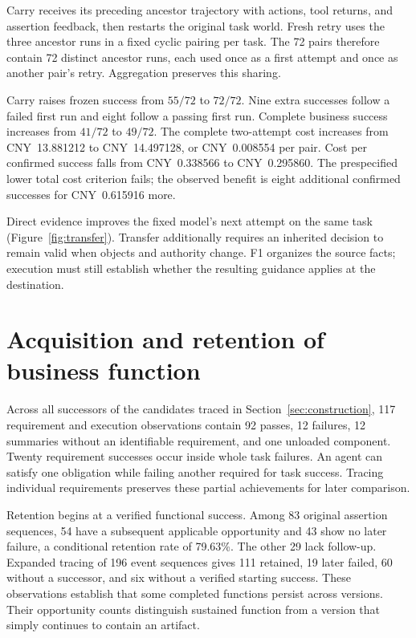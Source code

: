 \documentclass{ecai}
\begin{document}
Carry receives its preceding ancestor trajectory with actions, tool returns, and assertion feedback, then restarts the original task world. Fresh retry uses the three ancestor runs in a fixed cyclic pairing per task. The 72 pairs therefore contain 72 distinct ancestor runs, each used once as a first attempt and once as another pair's retry. Aggregation preserves this sharing.

Carry raises frozen success from $55/72$ to $72/72$. Nine extra successes follow a failed first run and eight follow a passing first run. Complete business success increases from $41/72$ to $49/72$. The complete two-attempt cost increases from CNY~13.881212 to CNY~14.497128, or CNY~0.008554 per pair. Cost per confirmed success falls from CNY~0.338566 to CNY~0.295860. The prespecified lower total cost criterion fails; the observed benefit is eight additional confirmed successes for CNY~0.615916 more.

Direct evidence improves the fixed model's next attempt on the same task (Figure~\ref{fig:transfer}). Transfer additionally requires an inherited decision to remain valid when objects and authority change. F1 organizes the source facts; execution must still establish whether the resulting guidance applies at the destination.

\section{Acquisition and retention of business function}
\label{sec:functional}

Across all successors of the candidates traced in Section~\ref{sec:construction}, 117 requirement and execution observations contain 92 passes, 12 failures, 12 summaries without an identifiable requirement, and one unloaded component. Twenty requirement successes occur inside whole task failures. An agent can satisfy one obligation while failing another required for task success. Tracing individual requirements preserves these partial achievements for later comparison.

Retention begins at a verified functional success. Among 83 original assertion sequences, 54 have a subsequent applicable opportunity and 43 show no later failure, a conditional retention rate of 79.63\%. The other 29 lack follow-up. Expanded tracing of 196 event sequences gives 111 retained, 19 later failed, 60 without a successor, and six without a verified starting success. These observations establish that some completed functions persist across versions. Their opportunity counts distinguish sustained function from a version that simply continues to contain an artifact.
\end{document}
